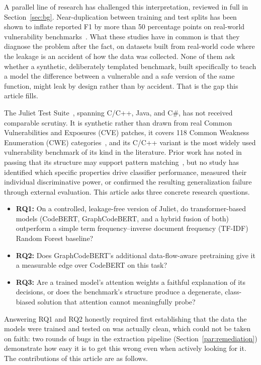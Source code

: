 \documentclass{ieeeaccess}
\begin{document}
A parallel line of research has challenged this interpretation, reviewed in full in Section~\ref{sec:bg}. Near-duplication between training and test splits has been shown to inflate reported F1 by more than 50 percentage points on real-world vulnerability benchmarks~\cite{ref1,ref9,ref10}. What these studies have in common is that they diagnose the problem after the fact, on datasets built from real-world code where the leakage is an accident of how the data was collected. None of them ask whether a synthetic, deliberately templated benchmark, built specifically to teach a model the difference between a vulnerable and a safe version of the same function, might leak by design rather than by accident. That is the gap this article fills.

The Juliet Test Suite~\cite{ref11}, spanning C/C++, Java, and C\#, has not received comparable scrutiny. It is synthetic rather than drawn from real Common Vulnerabilities and Exposures (CVE) patches, it covers 118 Common Weakness Enumeration (CWE) categories~\cite{ref12}, and its C/C++ variant is the most widely used vulnerability benchmark of its kind in the literature. Prior work has noted in passing that its structure may support pattern matching~\cite{ref1}, but no study has identified which specific properties drive classifier performance, measured their individual discriminative power, or confirmed the resulting generalization failure through external evaluation. This article asks three concrete research questions.

\begin{itemize}
\item \textbf{RQ1:} On a controlled, leakage-free version of Juliet, do transformer-based models (CodeBERT, GraphCodeBERT, and a hybrid fusion of both) outperform a simple term frequency--inverse document frequency (TF-IDF) Random Forest baseline?
\item \textbf{RQ2:} Does GraphCodeBERT's additional data-flow-aware pretraining give it a measurable edge over CodeBERT on this task?
\item \textbf{RQ3:} Are a trained model's attention weights a faithful explanation of its decisions, or does the benchmark's structure produce a degenerate, class-biased solution that attention cannot meaningfully probe?
\end{itemize}

Answering RQ1 and RQ2 honestly required first establishing that the data the models were trained and tested on was actually clean, which could not be taken on faith: two rounds of bugs in the extraction pipeline (Section~\ref{par:remediation}) demonstrate how easy it is to get this wrong even when actively looking for it. The contributions of this article are as follows.
\end{document}
